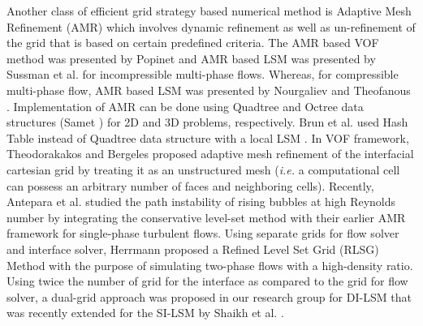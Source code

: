 \documentclass[preprint,12pt]{elsarticle}
\newcommand{\review}[1]{\color{black}#1}
\begin{document}
\review{Another class of efficient grid strategy based numerical method is Adaptive Mesh Refinement (AMR) \cite{berger1984}  which involves dynamic refinement as well as un-refinement of the grid that is based on certain predefined criteria.} The AMR based
VOF method was presented by Popinet \cite{popinet2009} and AMR based LSM
was presented by Sussman et al. \cite{sussman1999} for incompressible
multi-phase flows.  Whereas, for compressible multi-phase flow, AMR
based LSM was presented by Nourgaliev and Theofanous \cite{nourgaliev2007}.
Implementation of AMR can be done using Quadtree and Octree data structures (Samet
\cite{samet1989,samet1990}) for 2D and 3D problems, respectively. Brun
et al. \cite{brun2012} used Hash Table  instead of Quadtree data
structure with a local LSM  \cite{adalsteinsson1995,peng1999}. In VOF framework, Theodorakakos and Bergeles \cite{theodorakakos2004} proposed adaptive mesh refinement of the interfacial cartesian grid by treating it as an unstructured mesh (\emph{i.e.} a computational cell can possess an arbitrary number of faces and neighboring cells). Recently, Antepara et al. \cite{antepara2019} studied the path instability of rising bubbles at high Reynolds number by integrating the conservative level-set method with their earlier AMR framework \cite{antepara2015} for single-phase turbulent flows. \review{Using separate grids for flow solver and interface solver, Herrmann \cite{hermann2008} proposed a Refined Level Set Grid (RLSG) Method with the purpose of simulating two-phase flows with a high-density ratio.} Using twice the number
of grid for the interface as compared to the grid for flow solver, a dual-grid
approach was proposed in our research group for DI-LSM \cite{gada2011}
that was recently extended for the SI-LSM by Shaikh et al. \cite{shaikh2019}.
\end{document}
